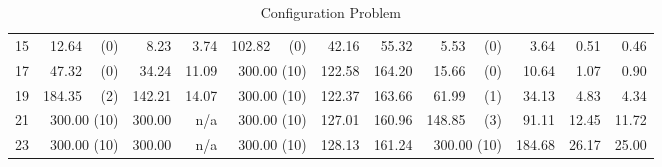 \documentclass[11pt,fleqn,twoside]{article}
\begin{document}
\begin{table}[t]
\begin{tabular}[t]{|r|r|r|r|r|r|r|r|r|r|r|}
15      & 12.64 ~~(0) & 8.23     & 3.74     & 102.82 ~~(0) & 42.16     & 55.32     & 5.53 ~~(0) & 3.64     & 0.51     & 0.46     \\
17      & 47.32 ~~(0) & 34.24     & 11.09     & 300.00 (10) & 122.58     & 164.20     & 15.66 ~~(0) & 10.64     & 1.07     & 0.90     \\
19      & 184.35 ~~(2) & 142.21     & 14.07     & 300.00 (10) & 122.37     & 163.66     & 61.99 ~~(1) & 34.13     & 4.83     & 4.34     \\
21      & 300.00 (10) & 300.00     & n/a     & 300.00 (10) & 127.01     & 160.96     & 148.85 ~~(3) & 91.11     & 12.45     & 11.72     \\
23      & 300.00 (10) & 300.00     & n/a     & 300.00 (10) & 128.13     & 161.24     & 300.00 (10) & 184.68     & 26.17     & 25.00     \\
					\hline
				\end{tabular}
				\caption{Configuration Problem}
				\label{tab:abstractConf}
			\end{table}
\end{document}
